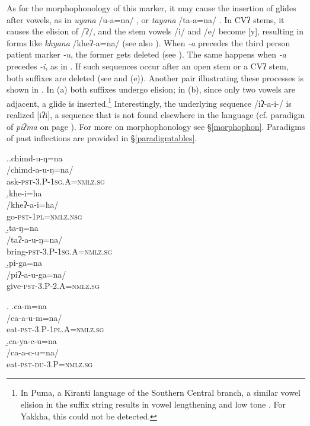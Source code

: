 As for the morphophonology of this marker, it may cause the insertion of glides after vowels, as in \emph{uyana} /u-a=na/ , or \emph{tayana} /ta-a=na/ . In CVʔ stems, it causes the elision of /ʔ/, and the stem vowels /i/ and /e/ become [y], resulting in forms like   \emph{khyana} /kheʔ-a=na/  (see also \Last[a]).  When \emph{-a} precedes the third person patient marker \emph{-u}, the former gets deleted (see \Next[a]). The same happens when \emph{-a} precedes \emph{-i}, as in \Next[b]. If such sequences occur after an open stem or a CVʔ stem, both suffixes are deleted (see \Next[c] and (e)). Another pair illustrating these processes is shown in \NNext. In (a) both suffixes undergo elision; in (b), since only two vowels are adjacent, a glide is inserted.\footnote{In Puma, a Kiranti language of the Southern Central branch, a similar vowel elision in the suffix string results in vowel lengthening and low tone \citep{Bickeletal2006The-Chintang}. For Yakkha, this could not be detected.} Interestingly, the underlying sequence /iʔ-a-i-/ is realized [iʔi], a sequence that is not found elsewhere in the language (cf. paradigm of \emph{piʔma}  on page \pageref{par-pipma-pst}). For more on morphophonology see §\ref{morphophon}. Paradigms of past inflections are provided in §\ref{paradigmtables}.

\ex.\a.\glll chimd-u-ŋ=na\\
 /chimd-a-u-ŋ=na/\\
ask{\scshape -pst-3.P-1sg.A=nmlz.sg}\\
\b.\glll khe-i=ha\\
 /kheʔ-a-i=ha/\\
go{\scshape -pst-1pl=nmlz.nsg}\\
\b.\glll ta-ŋ=na \\
/taʔ-a-u-ŋ=na/\\
bring{\scshape -pst-3.P-1sg.A=nmlz.sg}\\
\b.\glll pi-ga=na \\
/piʔ-a-u-ga=na/\\
give{\scshape -pst-3.P-2.A=nmlz.sg}\\

\ex. \a.\glll ca-m=na\\
 /ca-a-u-m=na/\\
eat{\scshape -pst-3.P-1pl.A=nmlz.sg}\\
\b.\glll ca-ya-c-u=na \\
/ca-a-c-u=na/\\
eat{\scshape -pst-du-3.P=nmlz.sg}\\



